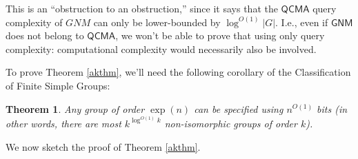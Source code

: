 \documentclass[12pt]{report}
\theoremstyle{plain}
\newtheorem{theorem}{Theorem}[section]
\theoremstyle{definition}
\begin{document}
This is an ``obstruction to an obstruction,'' since it says that the $\mathsf{QCMA}$ query complexity of $GNM$ can only be lower-bounded by $\log^{O(1)} |G|$.
I.e., even if $\mathsf{GNM}$ does not belong to $\mathsf{QCMA}$, we
won't be able to prove that using only query complexity: computational complexity would necessarily also be involved.

To prove Theorem \ref{akthm}, we'll need the following corollary of the Classification of Finite Simple Groups:

\begin{theorem}
\label{finitesimple}
  Any group of order $\exp ( n)$ can be specified using $n^{O ( 1)}$ bits (in other words, there are most $k^{\log^{O(1)}k}$ non-isomorphic groups of order $k$).
\end{theorem}

We now sketch the proof of Theorem \ref{akthm}.
\end{document}

